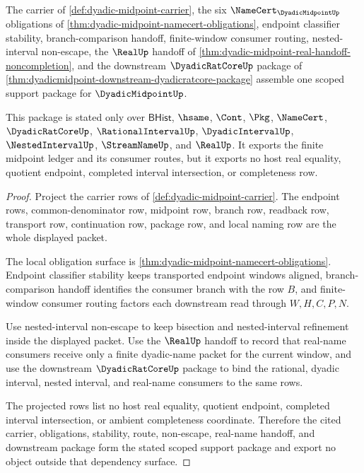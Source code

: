 \begin{theorem}\label{thm:dyadic-midpoint-scoped-support-package}
The carrier of \autoref{def:dyadic-midpoint-carrier}, the six $\NameCert_{\DyadicMidpointUp}$ obligations of \autoref{thm:dyadic-midpoint-namecert-obligations}, endpoint classifier stability, branch-comparison handoff, finite-window consumer routing, nested-interval non-escape, the $\RealUp$ handoff of \autoref{thm:dyadic-midpoint-real-handoff-noncompletion}, and the downstream $\DyadicRatCoreUp$ package of \autoref{thm:dyadicmidpoint-downstream-dyadicratcore-package} assemble one scoped support package for $\DyadicMidpointUp$.

This package is stated only over $\mathsf{BHist}$, $\hsame$, $\Cont$, $\Pkg$, $\NameCert$, $\DyadicRatCoreUp$, $\RationalIntervalUp$, $\DyadicIntervalUp$, $\NestedIntervalUp$, $\StreamNameUp$, and $\RealUp$. It exports the finite midpoint ledger and its consumer routes, but it exports no host real equality, quotient endpoint, completed interval intersection, or completeness row.
\end{theorem}
\begin{proof}
Project the carrier rows of \autoref{def:dyadic-midpoint-carrier}. The endpoint rows, common-denominator row, midpoint row, branch row, readback row, transport row, continuation row, package row, and local naming row are the whole displayed packet.

The local obligation surface is \autoref{thm:dyadic-midpoint-namecert-obligations}. Endpoint classifier stability keeps transported endpoint windows aligned, branch-comparison handoff identifies the consumer branch with the row $B$, and finite-window consumer routing factors each downstream read through $W,H,C,P,N$.

Use nested-interval non-escape to keep bisection and nested-interval refinement inside the displayed packet. Use the $\RealUp$ handoff to record that real-name consumers receive only a finite dyadic-name packet for the current window, and use the downstream $\DyadicRatCoreUp$ package to bind the rational, dyadic interval, nested interval, and real-name consumers to the same rows.

The projected rows list no host real equality, quotient endpoint, completed interval intersection, or ambient completeness coordinate. Therefore the cited carrier, obligations, stability, route, non-escape, real-name handoff, and downstream package form the stated scoped support package and export no object outside that dependency surface.
\end{proof}

